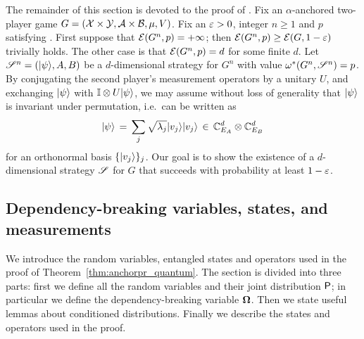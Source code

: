 
The remainder of this section is devoted to the proof of . Fix an $\alpha$-anchored two-player game $G = (\X \times \Y,\A \times \B,\mu,V)$. Fix an $\eps > 0$, integer $n\geq 1$ and $p$ satisfying . First suppose that $\E(G^n,p) = +\infty$; then $\E(G^n,p) \geq \E(G,1 - \eps)$ trivially holds. The other case is that $\E(G^n,p) = d$ for some finite $d$. Let $\strategy^n = (\ket{\psi},A,B)$ be a $d$-dimensional strategy for $G^n$ with value $\eval(G^n,\strategy^n) = p$. By conjugating the second player's measurement operators by a unitary $U$, and exchanging $\ket{\psi}$ with $\Id \otimes U \ket{\psi}$, we may assume without loss of generality that $\ket{\psi}$ is  invariant under permutation, i.e.\ can be written as 
\[ \ket{\psi} \,=\, \sum_j \sqrt{\lambda_j} \ket{v_j} \ket{v_j}\,\in \, \C_{E_A}^d \otimes \C_{E_B}^d\]
for an orthonormal basis $\{ \ket{v_j} \}_j$. Our goal is to show the existence of a $d$-dimensional strategy $\strategy$ for $G$ that succeeds with probability at least $1 - \eps$. 





\subsection{Dependency-breaking variables, states, and measurements}
\label{sec:quantum_setup}

We introduce the random variables, entangled states and operators used in the proof of Theorem~\ref{thm:anchorpr_quantum}. The section is divided into three parts: first we define all the random variables and their joint distribution $\P$; in particular we define the dependency-breaking variable $\bOmega$. Then we state useful lemmas about conditioned distributions. Finally we describe the states and operators used in the proof.

